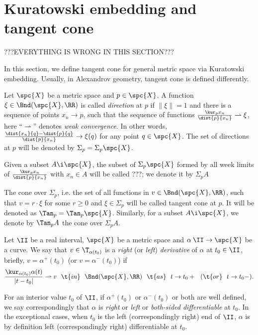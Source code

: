 {\section{Kuratowski embedding and tangent cone}

???EVERYTHING IS WRONG IN THIS SECTION???

In this section, we define tangent cone for general metric space via Kuratowski embedding.
Usually, in Alexandrov geometry, tangent cone is defined differently.

Let $\spc{X}$ be a metric space and $p\in\spc{X}$.
A function $\xi\in\Bnd(\spc{X},\RR)$ is called \emph{direction} at $p$ if $\|\xi\|=1$ and there is a sequence of points $x_n\to p$, such that the sequence of functions $\frac{\kur_p x_n}{\dist{p}{x_n}}\rightharpoonup\xi$,
here ``$\rightharpoonup$''\index{$\rightharpoonup$} denotes \emph{weak convergence}.
In other words, $\frac{\dist{x_n}{q}-\dist{p}{q}}{\dist{p}{x_n}}\to \xi(q)$ for any point $q\in \spc{X}$.
The set of directions at $p$ will be denoted by $\Sigma_p=\Sigma_p\spc{X}$.


Given a subset $A\i \spc{X}$, the subset of $\Sigma_p\spc{X}$ formed by all week limits of $\frac{\kur_p x_n}{\dist{p}{x_n}}$ with $x_n\in A$
will be called ???; we denote it by $\Sigma_p A$ 

The cone over  $\Sigma_p$,
i.e. the set of all functions in $v\in\Bnd(\spc{X},\RR)$, such that 
$v=r\cdot\xi$ for some $r\ge 0$ and $\xi\in\Sigma_p$ will be called tangent cone at $p$.
It will be denoted as $\Tan_p=\Tan_p\spc{X}$.
Similarly, for a subset $A\i\spc{X}$, we denote by $\Tan_p A$ the cone over $\Sigma_p A$.








Let $\II$ be a real interval,
$\spc{X}$ be a metric space 
and $\alpha\:\II\to \spc{X}$ be a curve.
We say that $v\in\T_{\alpha(t_0)}$ is a \emph{right} (or \emph{left}) \emph{derivative} of $\alpha$ at $t_0\in\II$, briefly, $v=\alpha^+(t_0)$ (or $v=\alpha^-(t_0)$)
if 
$$\frac{\kur_{\alpha(t_0)}{\alpha(t)}}{|t-t_0|}\rightharpoonup v\ \ \t{in}\ \ \Bnd(\spc{X},\RR)\ \ \t{as}\ \ t\to t_0+\ \ (\t{or}\ \ t\to t_0-).$$


For an interior value $t_0$ of $\II$, 
if $\alpha^+(t_0)$ or $\alpha^-(t_0)$ or both are well defined,
we say correspondingly that  $\alpha$ is \emph{right} or \emph{left} or \emph{both-sided differentiable} at $t_0$.
In the exceptional cases, when $t_0$ is the left (correspondingly right) end of $\II$, $\alpha$ is by definition left (correspondingly right) differentiable at $t_0$.

}
